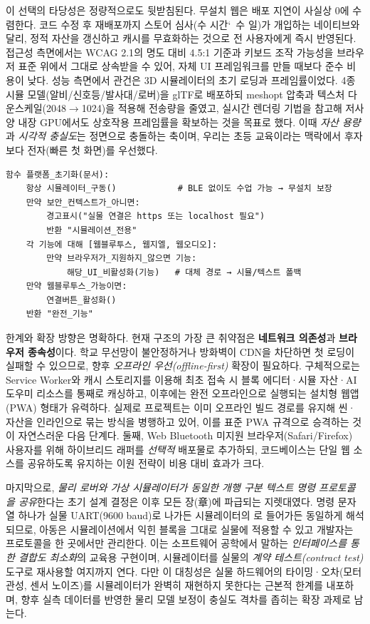 이 선택의 타당성은 정량적으로도 뒷받침된다. 무설치 웹은 배포 지연이 사실상 0에 수렴한다. 코드 수정 후 재배포까지 스토어 심사(수 시간\char`~수 일)가 개입하는 네이티브와 달리, 정적 자산을 갱신하고 캐시를 무효화하는 것으로 전 사용자에게 즉시 반영된다. 접근성 측면에서는 WCAG 2.1\cite{wcag21}의 명도 대비 4.5:1 기준과 키보드 조작 가능성을 브라우저 표준 위에서 그대로 상속받을 수 있어, 자체 UI 프레임워크를 만들 때보다 준수 비용이 낮다. 성능 측면에서 관건은 3D 시뮬레이터의 초기 로딩과 프레임률이었다. 4종 시뮬 모델(알비/신호등/발사대/로버)을 glTF\cite{gltf}로 배포하되 meshopt\cite{meshopt} 압축과 텍스처 다운스케일(2048$\to$1024)을 적용해 전송량을 줄였고, 실시간 렌더링 기법\cite{akenine2018realtime}을 참고해 저사양 내장 GPU에서도 상호작용 프레임률을 확보하는 것을 목표로 했다. 이때 \emph{자산 용량}과 \emph{시각적 충실도}는 정면으로 충돌하는 축이며, 우리는 초등 교육이라는 맥락에서 후자보다 전자(빠른 첫 화면)를 우선했다.

\begin{verbatim}
함수 플랫폼_초기화(문서):
    항상 시뮬레이터_구동()            # BLE 없이도 수업 가능 → 무설치 보장
    만약 보안_컨텍스트가_아니면:
        경고표시("실물 연결은 https 또는 localhost 필요")
        반환 "시뮬레이션_전용"
    각 기능에 대해 [웹블루투스, 웹지엘, 웹오디오]:
        만약 브라우저가_지원하지_않으면 기능:
            해당_UI_비활성화(기능)   # 대체 경로 → 시뮬/텍스트 폴백
    만약 웹블루투스_가능이면:
        연결버튼_활성화()
    반환 "완전_기능"
\end{verbatim}

한계와 확장 방향은 명확하다. 현재 구조의 가장 큰 취약점은 \textbf{네트워크 의존성}과 \textbf{브라우저 종속성}이다. 학교 무선망이 불안정하거나 방화벽이 CDN을 차단하면 첫 로딩이 실패할 수 있으므로, 향후 \emph{오프라인 우선(offline-first)} 확장이 필요하다. 구체적으로는 Service Worker와 캐시 스토리지를 이용해 최초 접속 시 블록 에디터·시뮬 자산·AI 도우미 리소스를 통째로 캐싱하고, 이후에는 완전 오프라인으로 실행되는 설치형 웹앱(PWA) 형태가 유력하다. 실제로 프로젝트는 이미  오프라인 빌드 경로를 유지해 씬·자산을 인라인으로 묶는 방식을 병행하고 있어\cite{ares-repo}, 이를 표준 PWA 규격으로 승격하는 것이 자연스러운 다음 단계다. 둘째, Web Bluetooth 미지원 브라우저(Safari/Firefox) 사용자를 위해 하이브리드 래퍼를 \emph{선택적} 배포물로 추가하되, 코드베이스는 단일 웹 소스를 공유하도록 유지하는 이원 전략이 비용 대비 효과가 크다.

마지막으로, \emph{물리 로버와 가상 시뮬레이터가 동일한 개행 구분 텍스트 명령 프로토콜을 공유}한다는 초기 설계 결정은 이후 모든 장(章)에 파급되는 지렛대였다. 명령 문자열 하나가 실물 UART(9600 baud)로 나가든 시뮬레이터의 로 들어가든 동일하게 해석되므로, 아동은 시뮬레이션에서 익힌 블록을 그대로 실물에 적용할 수 있고 개발자는 프로토콜을 한 곳에서만 관리한다. 이는 소프트웨어 공학에서 말하는 \emph{인터페이스를 통한 결합도 최소화}\cite{martin2008cleancode}의 교육용 구현이며, 시뮬레이터를 실물의 \emph{계약 테스트(contract test)} 도구로 재사용할 여지까지 연다. 다만 이 대칭성은 실물 하드웨어의 타이밍·오차(모터 관성, 센서 노이즈)를 시뮬레이터가 완벽히 재현하지 못한다는 근본적 한계를 내포하며, 향후 실측 데이터를 반영한 물리 모델 보정이 충실도 격차를 좁히는 확장 과제로 남는다.

